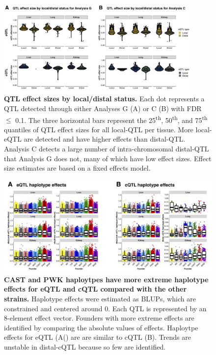 \documentclass[9pt,twocolumn,twoside]{gsajnl}
\begin{document}
\clearpage

\begin{figure}[hp]
\renewcommand{\familydefault}{\sfdefault}\normalfont
\centering
\includegraphics[width=0.9\textwidth, trim={0in 0.25in 0in 0in}, clip]{figs/qtl_effect_sizes_local_v_distal.png}
\caption{\textbf{QTL effect sizes by local/distal status.} 
Each dot represents a QTL detected through either Analyses G (A) or C (B) with FDR $\leq$ 0.1. The three horizontal bars represent the 25\textsuperscript{th}, 50\textsuperscript{th}, and 75\textsuperscript{th} quantiles of QTL effect sizes for all local-QTL per tissue. More local-eQTL are detected and have higher effects than distal-QTL. Analysis C detects a large number of intra-chromosomal distal-QTL that Analysis G does not, many of which have low effect sizes. Effect size estimates are based on a fixed effects model.
\label{fig:qtl_effect_sizes_local_v_distal}}
\end{figure}

\begin{figure}[hp]
\renewcommand{\familydefault}{\sfdefault}\normalfont
\centering
\includegraphics[width=\textwidth, trim={0in 0in 0in 0in}, clip]{figs/all_qtl_effects_abs.png}
\caption{\textbf{CAST and PWK haploytpes have more extreme haplotype effects for eQTL and cQTL compared with the other strains.} 
Haplotype effects were estimated as BLUPs, which are constrained and centered around 0. Each QTL is represented by an 8-element effect vector. Founders with more extreme effects are identified by comparing the absolute values of effects. Haploytpe effects for eQTL (A() are are similar to cQTL (B). Trends are unstable in distal-cQTL because so few are identified.
\label{fig:qtl_effects_abs}}
\end{figure}
\end{document}

